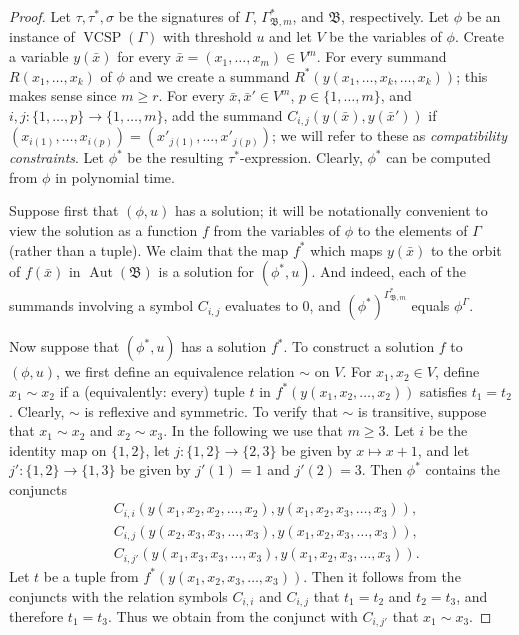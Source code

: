 \documentclass[nonacm]{acmart}
\newcommand{\bB}{{\mathfrak B}}
\DeclareMathOperator{\Aut}{Aut}
\DeclareMathOperator{\VCSP}{VCSP}
\begin{document}
\begin{proof}
Let $\tau,\tau^*,\sigma$ be the signatures of $\Gamma$, $\Gamma^*_{\bB,m}$, and $\bB$, respectively.  Let $\phi$ be an instance of 
$\VCSP(\Gamma)$ with threshold $u$ and let $V$ be the variables of $\phi$.  
Create a variable $y({\bar x})$ for every 
$\bar x =(x_1, \dots, x_m) \in V^m$. For every summand $R(x_1,\dots,x_k)$ of $\phi$ and
we create a summand $R^*(y(x_1, \dots, x_k, \dots, x_k))$; this makes sense since $m\geq r$. 
For every $\bar{x}, \bar{x}' \in V^m$, $p \in \{1,\dots,m\}$, and 
$i,j \colon \{1,\dots,p\} \to \{1,\dots,m\}$, add the summand 
$C_{i,j}(y(\bar x),y(\bar x'))$
if $(x_{i(1)},\dots, x_{i(p)}) = (x'_{j(1)},\dots, x'_{j(p)})$; we will refer to these as \emph{compatibility constraints}.  
Let $\phi^*$ be the resulting $\tau^*$-expression. 
Clearly, $\phi^*$ can be computed from $\phi$ in polynomial time. 


Suppose first that $(\phi,u)$ has a solution;
it will be notationally convenient to view the solution as a function $f$ from the variables of $\phi$ to the elements of $\Gamma$ (rather than a tuple). We claim that the map $f^*$ which maps $y(\bar x)$ to the orbit of $f(\bar x)$ in $\Aut(\bB)$ is a solution for $(\phi^*,u)$. And indeed, 
each of the summands involving a symbol $C_{i,j}$ evaluates to $0$,
and 
$(\phi^*)^{\Gamma^*_{\bB,m}}$ equals 
$\phi^{\Gamma}$. 


Now suppose that $(\phi^*,u)$ has a solution $f^*$. 
To construct a solution $f$ to $(\phi,u)$, we first define an equivalence relation $\sim$
on $V$. For $x_1,x_2 \in V$, define $x_1 \sim x_2$
if a (equivalently: every) tuple $t$ in $f^*(y(x_1,x_2,\dots,x_2))$
satisfies $t_1=t_2$.
Clearly, $\sim$ is reflexive and symmetric.
To verify that $\sim$ is transitive, suppose that 
 $x_1 \sim x_2$ and $x_2 \sim x_3$. 
 In the following we use that $m \geq 3$. 
Let $i$ be the identity map on $\{1,2\}$, 
let $j \colon \{1,2\} \to \{2,3\}$ be given by $x \mapsto x+1$, 
and let $j' \colon \{1,2\} \to \{1,3\}$ be given by $j'(1) = 1$ and $j'(2) = 3$. Then $\phi^*$ contains the conjuncts 
\begin{align*}
    & C_{i, i}(y(x_1, x_2, x_2, \dots, x_2), y(x_1,x_2,x_3,\dots,x_3)),\\ & C_{i, j}(y(x_2,x_3,x_3,\dots,x_3),y(x_1,x_2,x_3,\dots,x_3)), \\ 
    & C_{i, j'}(y(x_1,x_3,x_3,\dots,x_3),y(x_1,x_2,x_3,\dots,x_3)). 
\end{align*}
Let $t$ be a tuple from $f^*(y(x_1,x_2,x_3,\dots,x_3))$. 
Then it follows from the conjuncts with the relation symbols $C_{i,i}$ and $C_{i,j}$ that $t_1=t_2$ and $t_2=t_3$, and therefore $t_1=t_3$. Thus we obtain from the conjunct with $C_{i, j'}$ that $x_1 \sim x_3$. 


\end{proof}
\end{document}
